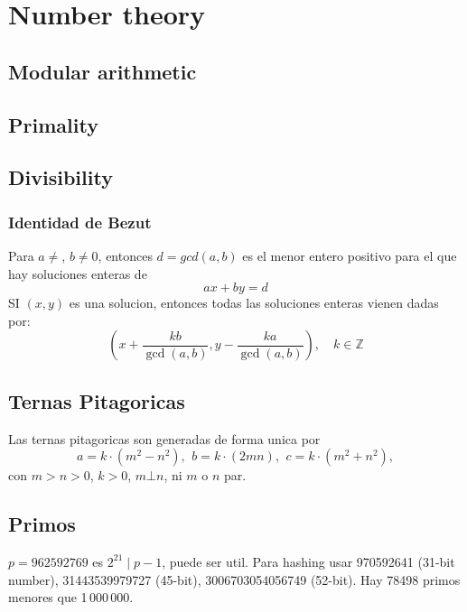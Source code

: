 \chapter{Number theory}

\section{Modular arithmetic}

\section{Primality}

\section{Divisibility}

	\subsection{Identidad de Bezut}
	Para $a \neq $, $b \neq 0$, entonces $d=gcd(a,b)$ es el menor entero positivo para el que hay soluciones enteras de
	$$ax+by=d$$
	SI $(x,y)$ es una solucion, entonces todas las soluciones enteras vienen dadas por:
	$$\left(x+\frac{kb}{\gcd(a,b)}, y-\frac{ka}{\gcd(a,b)}\right), \quad k\in\mathbb{Z}$$


\section{Ternas Pitagoricas}
 Las ternas pitagoricas son generadas de forma unica por
 \[ a=k\cdot (m^{2}-n^{2}),\ \,b=k\cdot (2mn),\ \,c=k\cdot (m^{2}+n^{2}), \]
 con $m > n > 0$, $k > 0$, $m \bot n$, ni $m$ o $n$ par.

\section{Primos}
	$p=962592769$ es $2^{21} \mid p-1$, puede ser util. Para hashing
	usar 970592641 (31-bit number), 31443539979727 (45-bit), 3006703054056749
	(52-bit). Hay  78498 primos menores que 1\,000\,000.

